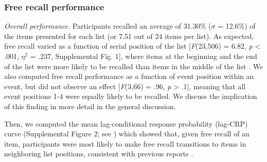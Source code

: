 \subsubsection{Free recall performance}\label{free-recall-performance}

\emph{Overall performance.} Participants recalled an average of 31.30\%
(\(\sigma\) = 12.6\%) of the items presented for each list (or 7.51 out
of 24 items per list). As expected, free recall varied as a function of
serial position of the list {[}\emph{F}(23,506) = 6.82, \emph{p}
\textless{} .001, \(\eta^{2}\) = .237, Supplemental Fig. 1{]}, where
items at the beginning and the end of the list were more likely to be
recalled than items in the middle of the list
\autocite{murdock_serial_1962}. We also computed free recall performance
as a function of event position within an event, but did not observe an
effect {[}\emph{F}(3,66) = .96, \emph{p} \textgreater{} .1{]}, meaning
that all event positions 1-4 were equally likely to be recalled. We
discuss the implication of this finding in more detail in the general
discussion.

Then, we computed the mean lag-conditional response probability
(lag-CRP) curve (Supplemental Figure 2; see
\autocite{kahana_associative_1996}) which showed that, given free recall
of an item, participants were most likely to make free recall
transitions to items in neighboring list positions, consistent with
previous reports
\autocites{howard_distributed_2002}{kahana_associative_1996}.

